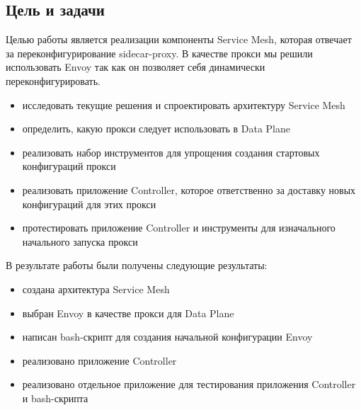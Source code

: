\subsection{Цель и задачи}

Целью работы является реализации компоненты Service Mesh, которая отвечает за переконфигурирование sidecar-proxy. В качестве прокси мы решили использовать Envoy так как он позволяет себя динамически переконфигурировать.
\begin{itemize}
	\item исследовать текущие решения и спроектировать архитектуру Service Mesh
	\item определить, какую прокси следует использовать в Data Plane
	\item реализовать набор инструментов для упрощения создания стартовых конфигураций прокси
	\item реализовать приложение Controller, которое ответственно за доставку новых конфигураций для этих прокси
	 \item протестировать приложение Controller и инструменты для изначального начального запуска прокси
\end{itemize}

В результате работы были получены следующие результаты:
\begin{itemize}
    \item создана архитектура Service Mesh
	\item выбран Envoy в качестве прокси для Data Plane
	\item написан bash-скрипт для создания начальной конфигурации Envoy
	\item реализовано приложение Controller
	\item реализовано отдельное приложение для тестирования приложения Controller и bash-скрипта
\end{itemize}

